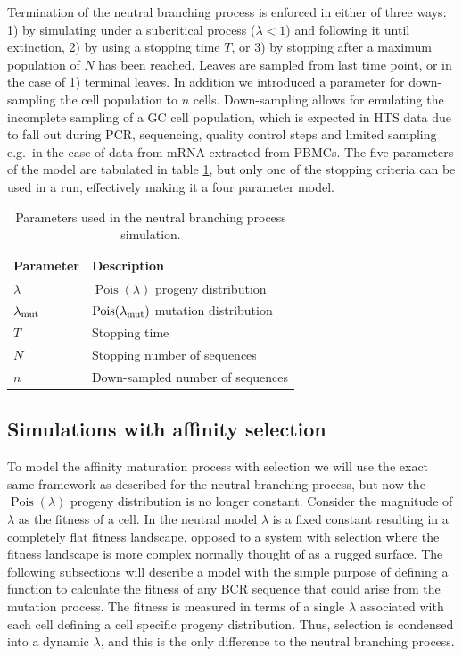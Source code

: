Termination of the neutral branching process is enforced in either of three ways: 1) by simulating under a subcritical process ($\lambda < 1$) \cite{gwp} and following it until extinction, 2) by using a stopping time $T$, or 3) by stopping after a maximum population of $N$ has been reached.
Leaves are sampled from last time point, or in the case of 1) terminal leaves.
In addition we introduced a parameter for down-sampling the cell population to $n$ cells.
Down-sampling allows for emulating the incomplete sampling of a GC cell population, which is expected in HTS data due to fall out during PCR, sequencing, quality control steps and limited sampling e.g.\ in the case of data from mRNA extracted from PBMCs.
The five parameters of the model are tabulated in table \ref{neut_constants}, but only one of the stopping criteria can be used in a run, effectively making it a four parameter model.

\begin{table}[ht]
\centering
\begin{tabular}{ll}
Parameter    & Description \\ \hline
$\lambda$ & $\operatorname{Pois}(\lambda)$ progeny distribution \\
$\lambda_{\text{mut}}$ & $\operatorname{Pois}(\lambda_{\text{mut}})$ mutation distribution \\
$T$ & Stopping time \\
$N$ & Stopping number of sequences \\
$n$ & Down-sampled number of sequences
\end{tabular}
\caption{
\label{neut_constants}
    Parameters used in the neutral branching process simulation.}
\end{table}






\subsection{Simulations with affinity selection}
To model the affinity maturation process with selection we will use the exact same framework as described for the neutral branching process, but now the $\operatorname{Pois}(\lambda)$ progeny distribution is no longer constant.
Consider the magnitude of $\lambda$ as the fitness of a cell.
In the neutral model $\lambda$ is a fixed constant resulting in a completely flat fitness landscape, opposed to a system with selection where the fitness landscape is more complex normally thought of as a rugged surface.
The following subsections will describe a model with the simple purpose of defining a function to calculate the fitness of any BCR sequence that could arise from the mutation process.
The fitness is measured in terms of a single $\lambda$ associated with each cell defining a cell specific progeny distribution.
Thus, selection is condensed into a dynamic $\lambda$, and this is the only difference to the neutral branching process.



